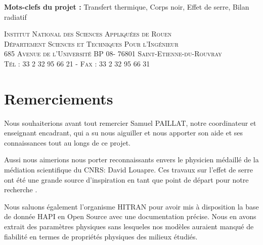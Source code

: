 \documentclass[a4paper, 12pt]{report} %
\begin{document}
\textbf{Mots-clefs du projet :} Transfert thermique, Corps noir, Effet de serre, Bilan radiatif 
\vspace{\baselineskip} 

\vfill


\begin{center}
	\scshape Institut National des Sciences Appliquées de Rouen \\
	Département Sciences et Techniques Pour l'Ingénieur \\
	685 Avenue de l'Université BP 08- 76801 Saint-Etienne-du-Rouvray \\ Tél : 33 2 32 95 66 21 - Fax : 33 2 32 95 66 31
\end{center}


\newpage
\chapter*{Remerciements} 

\setlength{\parindent}{30pt}

\indent Nous souhaiterions avant tout remercier Samuel PAILLAT, notre
coordinateur et enseignant encadrant, qui a su nous aiguiller
et nous apporter son aide et ses connaissances tout au longs
de ce projet. \vspace{\baselineskip}

	Aussi nous aimerions nous porter reconnaissants 
envers le physicien médaillé de la médiation scientifique
du CNRS: David Louapre. Ces travaux sur l'effet de serre 
ont été une grande source d'inspiration en tant que point
de départ pour notre recherche . 
\vspace{\baselineskip}

\indent Nous saluons également l'organisme HITRAN  
pour avoir mis à disposition la base de donnée HAPI en Open Source avec une documentation 
précise. Nous en avons extrait des paramètres physiques sans lesqueles nos modèles auraient 
manqué de fiabilité en termes de propriétés physiques des milieux étudiés. \vspace{\baselineskip}
\end{document}
